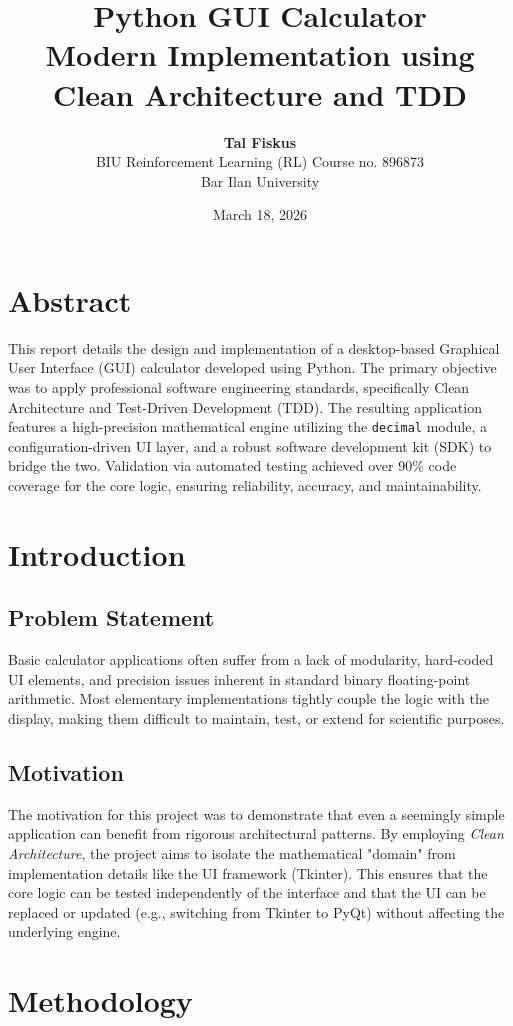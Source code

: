 \documentclass[12pt,a4paper]{article}
\title{
    \vspace*{2cm}
    \textbf{Python GUI Calculator} \\
    \large Modern Implementation using Clean Architecture and TDD
}
\author{
    \textbf{Tal Fiskus} \\
    BIU Reinforcement Learning (RL) Course no. 896873 \\
    Bar Ilan University
}
\date{March 18, 2026}
\begin{document}
\maketitle
\newpage

\section*{Abstract}
This report details the design and implementation of a desktop-based Graphical User Interface (GUI) calculator developed using Python. The primary objective was to apply professional software engineering standards, specifically Clean Architecture and Test-Driven Development (TDD). The resulting application features a high-precision mathematical engine utilizing the \texttt{decimal} module, a configuration-driven UI layer, and a robust software development kit (SDK) to bridge the two. Validation via automated testing achieved over 90\% code coverage for the core logic, ensuring reliability, accuracy, and maintainability.

\section{Introduction}
\subsection{Problem Statement}
Basic calculator applications often suffer from a lack of modularity, hard-coded UI elements, and precision issues inherent in standard binary floating-point arithmetic. Most elementary implementations tightly couple the logic with the display, making them difficult to maintain, test, or extend for scientific purposes.

\subsection{Motivation}
The motivation for this project was to demonstrate that even a seemingly simple application can benefit from rigorous architectural patterns. By employing \textit{Clean Architecture}, the project aims to isolate the mathematical "domain" from implementation details like the UI framework (Tkinter). This ensures that the core logic can be tested independently of the interface and that the UI can be replaced or updated (e.g., switching from Tkinter to PyQt) without affecting the underlying engine.

\section{Methodology}
\end{document}
